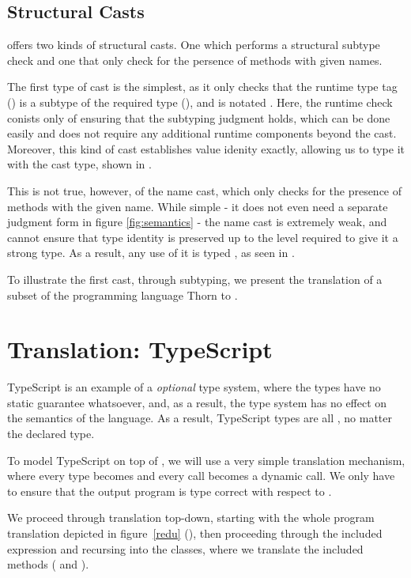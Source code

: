 \documentclass[a4paper,USenglish]{tex/lipics-v2016}
\begin{document}
\subsection{Structural Casts}

\kafka offers two kinds of structural casts. One which performs a structural
subtype check and one that only check for the persence of methods with given
names. 

The first type of cast is the simplest, as it only checks that the runtime type
tag (\C) is a subtype of the required type (\D), and is notated \SubCast\D\e. 
Here, the runtime check conists only of ensuring that the subtyping judgment
holds, which can be done easily and does not require any additional runtime 
components beyond the cast. Moreover, this kind of cast establishes value idenity
exactly, allowing us to type it with the cast type, shown in .

This is not true, however, of the name cast, which only checks for the presence
of methods with the given name. While simple - it does not even need
a separate judgment form in figure \ref{fig:semantics} - the name cast is
extremely weak, and cannot ensure that type identity is preserved up to the 
level required to give it a strong \kafka type. As a result, any use of it is
typed \any, as seen in .

To illustrate the first cast, through subtyping, we present the 
translation of a subset of the programming language Thorn to \kafka. 

\section{Translation: TypeScript}

TypeScript is an example of a \emph{optional} type system, where the types have
no static guarantee whatsoever, and, as a result, the type system has no effect
on the semantics of the language. As a result, TypeScript types are all \any,
no matter the declared type.

To model TypeScript on top of \kafka, we will use a very simple translation 
mechanism, where every type becomes \any and every call becomes a dynamic call.
We only have to ensure that the output program is type correct with respect to
\kafka.

We proceed through translation top-down, starting with the whole program 
translation depicted in figure~\ref{redu} (), then proceeding 
through the included expression and recursing into the classes, where we 
translate the included methods ( and ).
\end{document}
